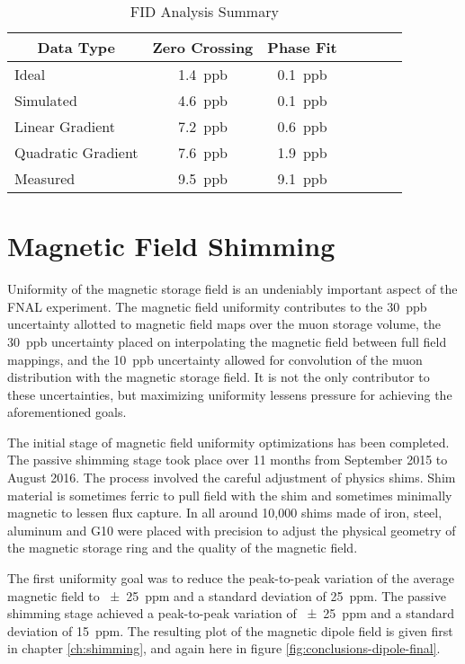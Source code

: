 \begin{table}[h]
\label{tab:conclusion-fid-summary}
\caption{FID Analysis Summary}
\centering
\begin{tabular}{l c c c c c c}
    \hline
    \multicolumn{1}{c}{Data Type} & Zero Crossing & Phase Fit \\
    \hline
    Ideal                & \SI{1.4}{ppb}  & \SI{0.1}{ppb} \\
    Simulated            & \SI{4.6}{ppb}  & \SI{0.1}{ppb} \\
    Linear Gradient      & \SI{7.2}{ppb}  & \SI{0.6}{ppb} \\
    Quadratic Gradient   & \SI{7.6}{ppb}  & \SI{1.9}{ppb} \\
    Measured             & \SI{9.5}{ppb}  & \SI{9.1}{ppb} \\
    \hline
\end{tabular}
\end{table}

\section{Magnetic Field Shimming}

Uniformity of the magnetic storage field is an undeniably important aspect of the FNAL \mugmtwo experiment.  The magnetic field uniformity contributes to the \SI{30}{ppb} uncertainty allotted to magnetic field maps over the muon storage volume, the \SI{30}{ppb} uncertainty placed on interpolating the magnetic field between full field mappings, and the \SI{10}{ppb} uncertainty allowed for convolution of the muon distribution with the magnetic storage field. It is not the only contributor to these uncertainties, but maximizing uniformity lessens pressure for achieving the aforementioned goals.

The initial stage of magnetic field uniformity optimizations has been completed.  The passive shimming stage took place over 11 months from September 2015 to August 2016.  The process involved the careful adjustment of physics shims.  Shim material is sometimes ferric to pull field with the shim and sometimes minimally magnetic to lessen flux capture.  In all around 10,000 shims made of iron, steel, aluminum and G10 were placed with precision to adjust the physical geometry of the magnetic storage ring and the quality of the magnetic field.

The first uniformity goal was to reduce the peak-to-peak variation of the average magnetic field to \SI{\pm 25}{ppm} and a standard deviation of \SI{25}{ppm}.  The passive shimming stage achieved a peak-to-peak variation of \SI{\pm 25}{ppm} and a standard deviation of \SI{15}{ppm}.  The resulting plot of the magnetic dipole field is given first in chapter \ref{ch:shimming}, and again here in figure \ref{fig:conclusions-dipole-final}.

